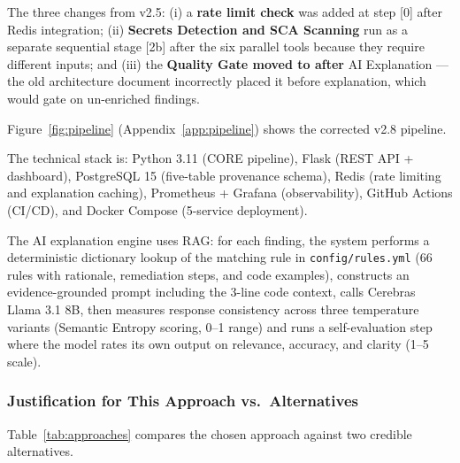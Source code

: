 \documentclass[12pt,a4paper]{article}
\begin{document}
The three changes from v2.5: (i) a \textbf{rate limit check} was added at step
[0] after Redis integration; (ii) \textbf{Secrets Detection and SCA Scanning} run
as a separate sequential stage [2b] after the six parallel tools because they
require different inputs; and (iii) the \textbf{Quality Gate moved to after} AI
Explanation --- the old architecture document incorrectly placed it before
explanation, which would gate on un-enriched findings.

Figure~\ref{fig:pipeline} (Appendix~\ref{app:pipeline}) shows the corrected
v2.8 pipeline.

The technical stack is: Python 3.11 (CORE pipeline), Flask (REST API + dashboard),
PostgreSQL 15 (five-table provenance schema), Redis (rate limiting and explanation
caching), Prometheus + Grafana (observability), GitHub Actions (CI/CD), and Docker
Compose (5-service deployment).

The AI explanation engine uses RAG: for each finding, the system performs a
deterministic dictionary lookup of the matching rule in \texttt{config/rules.yml}
(66 rules with rationale, remediation steps, and code examples), constructs an
evidence-grounded prompt including the 3-line code context, calls Cerebras
Llama 3.1 8B, then measures response consistency across three temperature variants
(Semantic Entropy scoring, 0--1 range) and runs a self-evaluation step where the
model rates its own output on relevance, accuracy, and clarity (1--5 scale).

\subsubsection{Justification for This Approach vs.\ Alternatives}

Table~\ref{tab:approaches} compares the chosen approach against two credible
alternatives.
\end{document}
